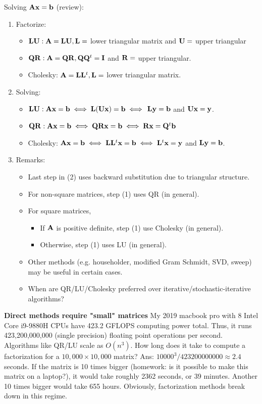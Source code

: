 \documentclass[./some_latex_template.tex]{subfiles}
\begin{document}
Solving $\mathbf{A} \mathbf{x} = \mathbf{b}$ (review):

\begin{enumerate}
	\item Factorize: 
		\begin{itemize}
			\item $\mathbf{L}\mathbf{U}: \mathbf{A} = \mathbf{L}\mathbf{U}, \mathbf{L} =$ lower triangular matrix and $\mathbf{U} =$ upper triangular
			\item $\mathbf{Q}\mathbf{R}: \mathbf{A} = \mathbf{Q}\mathbf{R}, \mathbf{Q}\mathbf{Q}^t = \mathbf{I}$ and $\mathbf{R} =$ upper triangular. 
			\item Cholesky: $\mathbf{A} = \mathbf{L}\mathbf{L}^t, \mathbf{L} =$ lower triangular matrix.
		\end{itemize}
	\item Solving:
		\begin{itemize}
			\item $\mathbf{L}\mathbf{U}: \mathbf{A}\mathbf{x} = \mathbf{b} \iff \mathbf{L}(\mathbf{U}\mathbf{x}) = \mathbf{b} \iff$ $\mathbf{L}\mathbf{y} = \mathbf{b}$ and $\mathbf{U}\mathbf{x} = \mathbf{y}$.
			\item $\mathbf{Q}\mathbf{R}: \mathbf{A}\mathbf{x} = \mathbf{b} \iff \mathbf{Q}\mathbf{R}\mathbf{x} = \mathbf{b} \iff \mathbf{R}\mathbf{x} = \mathbf{Q}^t\mathbf{b}$
			\item Cholesky: $\mathbf{A}\mathbf{x} = \mathbf{b} \iff \mathbf{L}\mathbf{L}^t\mathbf{x} = \mathbf{b} \iff \mathbf{L}^t\mathbf{x} = \mathbf{y}$ and $\mathbf{L}\mathbf{y} = \mathbf{b}$. 
		\end{itemize}
	\item Remarks:
		\begin{itemize}
			\item Last step in (2) uses backward substitution due to triangular structure. 
			\item For non-square matrices, step (1) uses QR (in general).
			\item For square matrices, 
				\begin{itemize}
					\item If $\mathbf{A}$ is positive definite, step (1) use Cholesky (in general).
					\item Otherwise, step (1) uses LU (in general). 
				\end{itemize}
			\item Other methods (e.g. householder, modified Gram Schmidt, SVD, sweep) may be useful in certain cases. 
			\item When are QR/LU/Cholesky preferred over iterative/stochastic-iterative algorithms?
		\end{itemize}
\end{enumerate}

\begin{examplebox}{\textbf{Direct methods require "small" matrices}}{}
My 2019 macbook pro with 8 Intel Core i9-9880H CPUs have 423.2 GFLOPS computing power total. Thus, it runs 423,200,000,000 (single precision) floating point operations per second. Algorithms like QR/LU scale as $O(n^3)$. How long does it take to compute a factorization for a $10,000 \times 10,000$ matrix? Ans: $10000^3 / 423200000000 \approx 2.4$ seconds. If the matrix is 10 times bigger (homework: is it possible to make this matrix on a laptop?), it would take roughly 2362 seconds, or 39 minutes. Another 10 times bigger would take 655 hours. Obviously, factorization methods break down in this regime. 
\end{examplebox}
\end{document}
